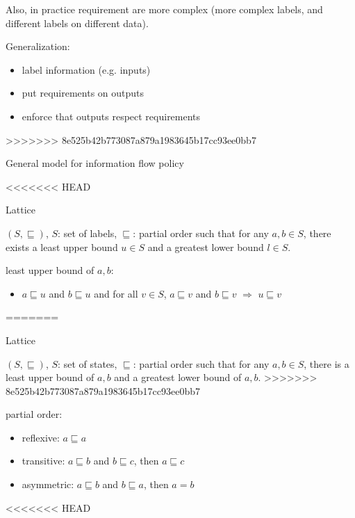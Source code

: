 Also, in practice requirement are more complex (more complex labels, and different labels on different data). 

Generalization:
\begin{itemize}
	\item label information (e.g. inputs)
	\item put requirements on outputs
	\item enforce that outputs respect requirements
\end{itemize}
>>>>>>> 8e525b42b773087a879a1983645b17cc93ee0bb7

General model for information flow policy

<<<<<<< HEAD
\begin{definition}{Lattice} %

    $(S, \sqsubseteq)$, $S$: set of labels, $\sqsubseteq$: partial order such
    that for any $a, b \in S$, there exists a least upper bound $u \in S$ and a
    greatest lower bound $l \in S$.

    least upper bound of $a, b$:
    \begin{itemize}
        \item $a \sqsubseteq u$ and $b \sqsubseteq u$ and for all $v \in S$,
            $a \sqsubseteq v$ and $b \sqsubseteq v$ $\Rightarrow$
            $u \sqsubseteq v$
    \end{itemize}
=======
\begin{definition}{Lattice}

    $(S, \sqsubseteq)$, $S$: set of states, $\sqsubseteq$: partial order such
    that for any $a, b \in S$, there is a least upper bound of $a, b$ and a
    greatest lower bound of $a,b$.
>>>>>>> 8e525b42b773087a879a1983645b17cc93ee0bb7

    partial order:
    \begin{itemize}
        \item reflexive: $a \sqsubseteq a$
        \item transitive: $a \sqsubseteq b$ and $b \sqsubseteq c$, then
            $a \sqsubseteq c$
        \item asymmetric: $a \sqsubseteq b$ and $b \sqsubseteq a$, then $a = b$
    \end{itemize}
<<<<<<< HEAD


\end{definition}
\end{definition}
